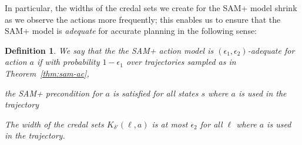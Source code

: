 \documentclass[letterpaper]{article} %
\newtheorem{definition}{Definition}
\begin{document}
In particular, the widths of the credal sets we create for the SAM+ model shrink as we observe the actions more frequently; this enables us to ensure that the SAM+ model is \emph{adequate} for accurate planning in the following sense:

\begin{definition}
We say that the the SAM+ action model  is \emph{$(\epsilon_1,\epsilon_2)$-adequate} for action $a$ if with probability $1-\epsilon_1$ over trajectories sampled as in Theorem~\ref{thm:sam-ac},
\begin{compactenum}
\item  the SAM+ precondition for $a$ is satisfied for all states $s$ where $a$ is used in the trajectory
\item The width of the credal sets $K_{\delta'}(\ell,a)$ is at most $\epsilon_2$ for all $\ell$ where $a$ is used in the trajectory.
\end{compactenum}
\end{definition}
\end{document}
